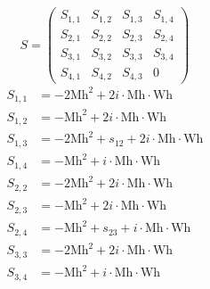 \documentclass[a4paper]{article}
\begin{document}
\begin{equation}
S=\left(\begin{array}{cccc}
   S_{1,1}&
   S_{1,2}&
   S_{1,3}&
   S_{1,4}\\
   S_{2,1}&
   S_{2,2}&
   S_{2,3}&
   S_{2,4}\\
   S_{3,1}&
   S_{3,2}&
   S_{3,3}&
   S_{3,4}\\
   S_{4,1}&
   S_{4,2}&
   S_{4,3}&
   0\end{array}\right)
\end{equation}
\begin{subequations}
\begin{align}
   S_{1,1}&=-2\text{Mh}^2+2i\cdot{}\text{Mh}\cdot{}\text{Wh}\\
   S_{1,2}&=-\text{Mh}^2+2i\cdot{}\text{Mh}\cdot{}\text{Wh}\\
   S_{1,3}&=-2\text{Mh}^2+s_{12}+2i\cdot{}\text{Mh}\cdot{}\text{Wh}\\
   S_{1,4}&=-\text{Mh}^2+i\cdot{}\text{Mh}\cdot{}\text{Wh}\\
   S_{2,2}&=-2\text{Mh}^2+2i\cdot{}\text{Mh}\cdot{}\text{Wh}\\
   S_{2,3}&=-\text{Mh}^2+2i\cdot{}\text{Mh}\cdot{}\text{Wh}\\
   S_{2,4}&=-\text{Mh}^2+s_{23}+i\cdot{}\text{Mh}\cdot{}\text{Wh}\\
   S_{3,3}&=-2\text{Mh}^2+2i\cdot{}\text{Mh}\cdot{}\text{Wh}\\
   S_{3,4}&=-\text{Mh}^2+i\cdot{}\text{Mh}\cdot{}\text{Wh}
\end{align}
\end{subequations}
\end{document}
